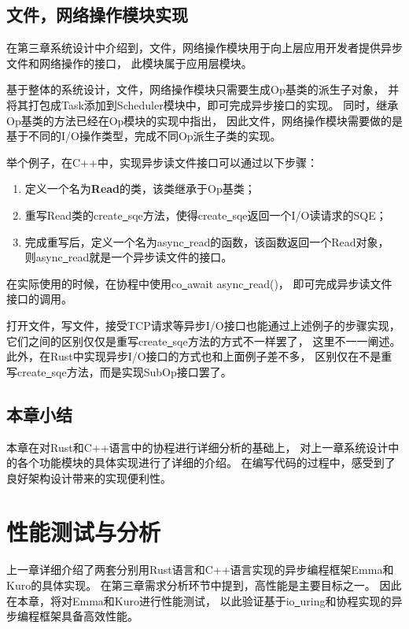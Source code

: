 \documentclass[supercite]{HustGraduPaper}
\theoremstyle{definition}
\begin{document}
\subsection{文件，网络操作模块实现}

在第三章系统设计中介绍到，文件，网络操作模块用于向上层应用开发者提供异步文件和网络操作的接口，
此模块属于应用层模块。\par

基于整体的系统设计，文件，网络操作模块只需要生成Op基类的派生子对象，
并将其打包成Task添加到Scheduler模块中，即可完成异步接口的实现。
同时，继承Op基类的方法已经在Op模块的实现中指出，
因此文件，网络操作模块需要做的是基于不同的I/O操作类型，完成不同Op派生子类的实现。\par

举个例子，在C++中，实现异步读文件接口可以通过以下步骤：

\begin{enumerate}[label={(\arabic*)}]
  \item 定义一个名为\textbf{Read}的类，该类继承于Op基类；
  \item 重写Read类的create\underline{~}sqe方法，使得create\underline{~}sqe返回一个I/O读请求的SQE；
  \item 完成重写后，定义一个名为async\underline{~}read的函数，该函数返回一个Read对象，
    则async\underline{~}read就是一个异步读文件的接口。
\end{enumerate}

在实际使用的时候，在协程中使用co\underline{~}await async\underline{~}read()，
即可完成异步读文件接口的调用。\par

打开文件，写文件，接受TCP请求等异步I/O接口也能通过上述例子的步骤实现，
它们之间的区别仅仅是重写create\underline{~}sqe方法的方式不一样罢了，
这里不一一阐述。此外，在Rust中实现异步I/O接口的方式也和上面例子差不多，
区别仅在不是重写create\underline{~}sqe方法，而是实现SubOp接口罢了。\par

\subsection{本章小结}

本章在对Rust和C++语言中的协程进行详细分析的基础上，
对上一章系统设计中的各个功能模块的具体实现进行了详细的介绍。
在编写代码的过程中，感受到了良好架构设计带来的实现便利性。\par

\section{性能测试与分析}
上一章详细介绍了两套分别用Rust语言和C++语言实现的异步编程框架Emma和Kuro的具体实现。
在第三章需求分析环节中提到，高性能是主要目标之一。
因此在本章，将对Emma和Kuro进行性能测试，
以此验证基于io\underline{~}uring和协程实现的异步编程框架具备高效性能。\par
\end{document}
